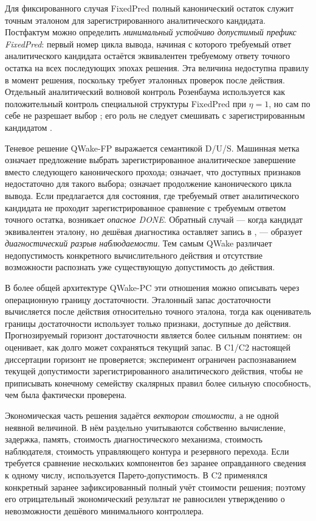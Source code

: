 Для фиксированного случая FixedPred полный канонический остаток служит точным
эталоном для зарегистрированного аналитического кандидата. Постфактум можно
определить \emph{минимальный устойчиво допустимый префикс FixedPred}: первый
номер цикла вывода, начиная с которого требуемый ответ аналитического
кандидата остаётся эквивалентен требуемому ответу точного остатка на всех
последующих эпохах решения. Эта величина недоступна правилу в момент решения,
поскольку требует эталонных проверок после действия. Отдельный аналитический
волновой контроль Розенбаума используется как положительный контроль специальной
структуры FixedPred при $\eta=1$, но сам по себе не разрешает выбор
; его роль не следует смешивать с зарегистрированным
кандидатом .

Теневое решение QWake-FP выражается семантикой D/U/S. Машинная метка
 означает предложение выбрать зарегистрированное аналитическое
завершение вместо следующего канонического прохода;  означает,
что доступных признаков недостаточно для такого выбора;  означает
продолжение канонического цикла вывода. Если  предлагается для
состояния, где требуемый ответ аналитического кандидата не проходит
зарегистрированное сравнение с требуемым ответом точного остатка, возникает
\emph{опасное DONE}. Обратный случай --- когда кандидат эквивалентен эталону,
но дешёвая диагностика оставляет запись в , --- образует
\emph{диагностический разрыв наблюдаемости}. Тем самым QWake различает
недопустимость конкретного вычислительного действия и отсутствие возможности
распознать уже существующую допустимость до действия.

В более общей архитектуре QWake-PC эти отношения можно описывать через
операционную границу достаточности. Эталонный запас достаточности вычисляется
после действия относительно точного эталона, тогда как оцениватель границы
достаточности использует только признаки, доступные до действия. Прогнозируемый
горизонт достаточности является более сильным понятием: он оценивает, как долго
может сохраняться текущий запас. В C1/C2 настоящей диссертации горизонт не
проверяется; эксперимент ограничен распознаванием текущей допустимости
зарегистрированного аналитического действия, чтобы не приписывать конечному
семейству скалярных правил более сильную способность, чем была фактически
проверена.

Экономическая часть решения задаётся \emph{вектором стоимости}, а не одной
неявной величиной. В нём раздельно учитываются собственно вычисление, задержка,
память, стоимость диагностического механизма, стоимость наблюдателя, стоимость
управляющего контура и резервного перехода. Если требуется сравнение нескольких
компонентов без заранее оправданного сведения к одному числу, используется
Парето-допустимость. В C2 применялся конкретный заранее зафиксированный полный
учёт стоимости решения; поэтому его отрицательный экономический результат не
равносилен утверждению о невозможности дешёвого минимального контроллера.

